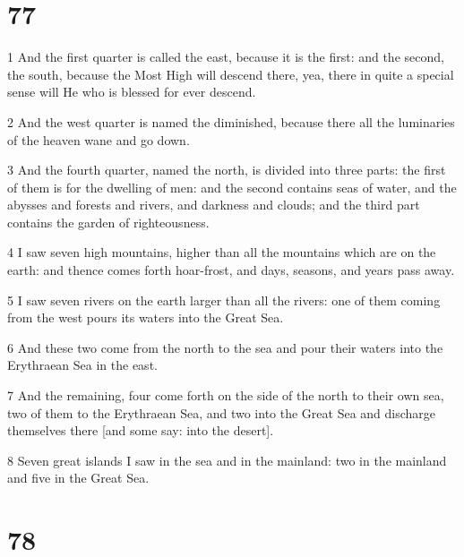 \chapter{77}

\par 1 And the first quarter is called the east, because it is the first: and the second, the south, because the Most High will descend there, yea, there in quite a special sense will He who is blessed for ever descend.
\par 2 And the west quarter is named the diminished, because there all the luminaries of the heaven wane and go down.
\par 3 And the fourth quarter, named the north, is divided into three parts: the first of them is for the dwelling of men: and the second contains seas of water, and the abysses and forests and rivers, and darkness and clouds; and the third part contains the garden of righteousness.
\par 4 I saw seven high mountains, higher than all the mountains which are on the earth: and thence comes forth hoar-frost, and days, seasons, and years pass away.
\par 5 I saw seven rivers on the earth larger than all the rivers: one of them coming from the west pours its waters into the Great Sea.
\par 6 And these two come from the north to the sea and pour their waters into the Erythraean Sea in the east.
\par 7 And the remaining, four come forth on the side of the north to their own sea, two of them to the Erythraean Sea, and two into the Great Sea and discharge themselves there [and some say: into the desert].
\par 8 Seven great islands I saw in the sea and in the mainland: two in the mainland and five in the Great Sea.

\chapter{78}

